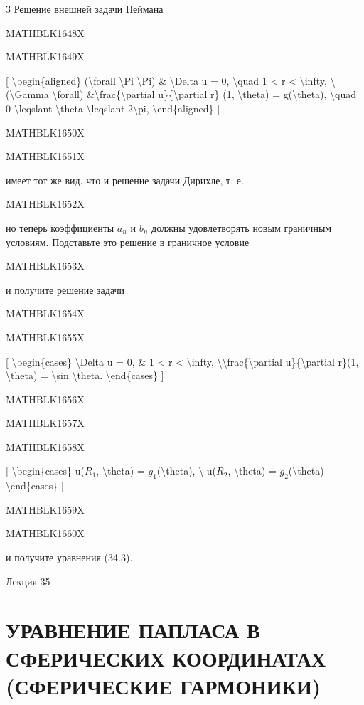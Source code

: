 \documentclass[
]{article}
\begin{document}
{{{3 Рещение внешней задачи Неймана

MATHBLK1648X

MATHBLK1649X

{[} \textbackslash begin\{aligned\} (\textbackslash forall
\textbackslash Pi \textbackslash Pi) \& \textbackslash Delta u = 0,
\textbackslash quad 1 \textless{} r \textless{} \textbackslash infty,
\textbackslash{} (\textbackslash Gamma \textbackslash forall)
\&\textbackslash frac\{\textbackslash partial
u\}\{\textbackslash partial r\} (1, \textbackslash theta) =
g(\textbackslash theta), \textbackslash quad 0 \textbackslash leqslant
\textbackslash theta \textbackslash leqslant 2\textbackslash pi,
\textbackslash end\{aligned\} {]}

MATHBLK1650X

MATHBLK1651X

имеет тот же вид, что и решение задачи Дирихле, т. е.

MATHBLK1652X

но теперь коэффициенты \(a_n\) и \(b_n\) должны удовлетворять новым
граничным условиям. Подставьте это решение в граничное условие

MATHBLK1653X

и получите решение задачи

MATHBLK1654X

MATHBLK1655X

{[} \textbackslash begin\{cases\} \textbackslash Delta u = 0, \& 1
\textless{} r \textless{} \textbackslash infty,
\textbackslash\textbackslash frac\{\textbackslash partial
u\}\{\textbackslash partial r\}(1, \textbackslash theta) =
\textbackslash sin \textbackslash theta. \textbackslash end\{cases\} {]}

MATHBLK1656X

MATHBLK1657X

MATHBLK1658X

{[} \textbackslash begin\{cases\} u(\(R_1\), \textbackslash theta) =
\(g_1\)(\textbackslash theta), \textbackslash{} u(\(R_2\),
\textbackslash theta) = \(g_2\)(\textbackslash theta)
\textbackslash end\{cases\} {]}

MATHBLK1659X

MATHBLK1660X

и получите уравнения (34.3).

Лекция 35

\section{УРАВНЕНИЕ ПАПЛАСА В СФЕРИЧЕСКИХ КООРДИНАТАХ (СФЕРИЧЕСКИЕ
ГАРМОНИКИ)}\label{ux443ux440ux430ux432ux43dux435ux43dux438ux435-ux43fux430ux43fux43bux430ux441ux430-ux432-ux441ux444ux435ux440ux438ux447ux435ux441ux43aux438ux445-ux43aux43eux43eux440ux434ux438ux43dux430ux442ux430ux445-ux441ux444ux435ux440ux438ux447ux435ux441ux43aux438ux435-ux433ux430ux440ux43cux43eux43dux438ux43aux438}

}}}
\end{document}
